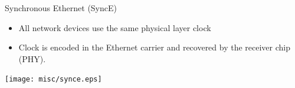 \documentclass[compress,red]{beamer}
\begin{document}
\begin{frame}{Synchronous Ethernet (SyncE)}
  \begin{center}
  \begin{itemize}
   	\item All network devices use the same physical layer clock
    \item Clock is encoded in the Ethernet carrier and recovered by the receiver chip (PHY).
  \end{itemize}
  \texttt{[image: misc/synce.eps]}
  \end{center}

\end{frame}
\end{document}
